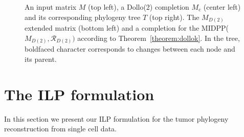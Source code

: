 \documentclass[a4paper,USenglish]{article}
\theoremstyle{definition}
\begin{document}
\begin{figure}[tb!]
  \begin{minipage}{.5\linewidth}
  \end{minipage}
  \begin{minipage}{.5\linewidth}
  \end{minipage}

  \caption{An input matrix $M$ (top left), a Dollo(2) completion $M_c$ (center
  left) and its corresponding phylogeny tree $T$ (top right). 
  The $M_{D(2)}$ extended matrix (bottom left) 
  and a completion for the MIDPP($M_{D(2)},\mathcal R_{D(2)})$
  according to Theorem~\ref{theorem:dollok}.
%
  In the tree, boldfaced character corresponds to changes between each
  node and its parent.  }
\label{fig:M_e}
\end{figure}

\section{The ILP formulation}
\label{sec:ilp}
In this section we present our ILP formulation for the tumor phylogeny
reconstruction from single cell data.
\end{document}
